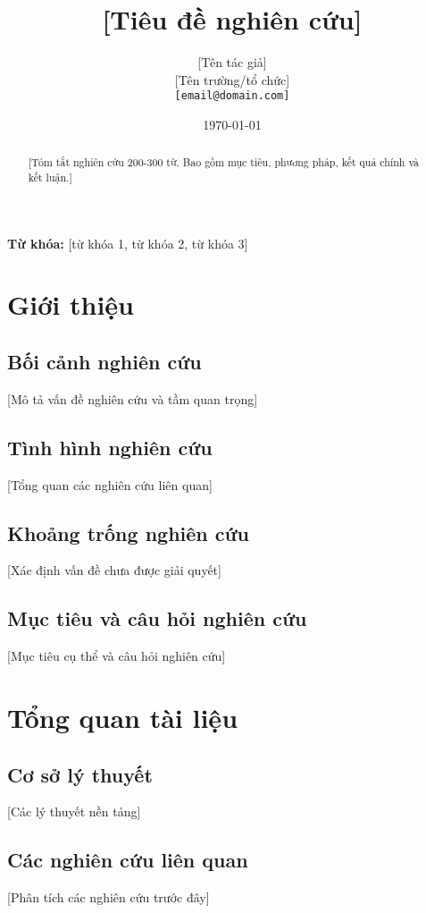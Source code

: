 \documentclass[12pt,a4paper]{article}
\title{[Tiêu đề nghiên cứu]}
\author{[Tên tác giả]\\
\small [Tên trường/tổ chức]\\
\small \texttt{[email@domain.com]}}
\date{\today}
\begin{document}
\maketitle

\begin{abstract}
[Tóm tắt nghiên cứu 200-300 từ. Bao gồm mục tiêu, phương pháp, kết quả chính và kết luận.]
\end{abstract}

\textbf{Từ khóa:} [từ khóa 1, từ khóa 2, từ khóa 3]

\newpage
\tableofcontents
\newpage

\section{Giới thiệu}

\subsection{Bối cảnh nghiên cứu}
[Mô tả vấn đề nghiên cứu và tầm quan trọng]

\subsection{Tình hình nghiên cứu}
[Tổng quan các nghiên cứu liên quan]

\subsection{Khoảng trống nghiên cứu}
[Xác định vấn đề chưa được giải quyết]

\subsection{Mục tiêu và câu hỏi nghiên cứu}
[Mục tiêu cụ thể và câu hỏi nghiên cứu]

\section{Tổng quan tài liệu}

\subsection{Cơ sở lý thuyết}
[Các lý thuyết nền tảng]

\subsection{Các nghiên cứu liên quan}
[Phân tích các nghiên cứu trước đây]
\end{document}

